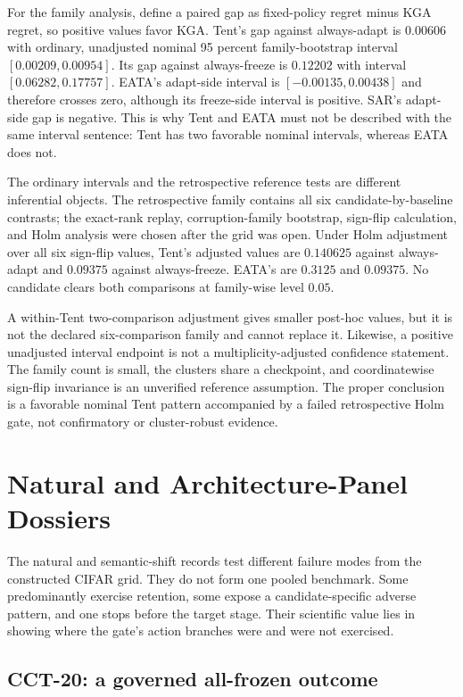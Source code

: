 For the family analysis, define a paired gap as fixed-policy regret minus KGA regret, so positive
values favor KGA.  Tent's gap against always-adapt is $0.00606$ with ordinary, unadjusted nominal
95 percent family-bootstrap interval $[0.00209,0.00954]$.  Its gap against always-freeze is
$0.12202$ with interval $[0.06282,0.17757]$.  EATA's adapt-side interval is
$[-0.00135,0.00438]$ and therefore crosses zero, although its freeze-side interval is positive.
SAR's adapt-side gap is negative.  This is why Tent and EATA must not be described with the same
interval sentence: Tent has two favorable nominal intervals, whereas EATA does not.

The ordinary intervals and the retrospective reference tests are different inferential objects.
The retrospective family contains all six candidate-by-baseline contrasts; the exact-rank replay,
corruption-family bootstrap, sign-flip calculation, and Holm analysis were chosen after the grid
was open.  Under Holm adjustment over all six sign-flip values, Tent's adjusted values are
$0.140625$ against always-adapt and $0.09375$ against always-freeze.  EATA's are $0.3125$ and
$0.09375$.  No candidate clears both comparisons at family-wise level $0.05$.

A within-Tent two-comparison adjustment gives smaller post-hoc values, but it is not the declared
six-comparison family and cannot replace it.  Likewise, a positive unadjusted interval endpoint is
not a multiplicity-adjusted confidence statement.  The family count is small, the clusters share a
checkpoint, and coordinatewise sign-flip invariance is an unverified reference assumption.  The
proper conclusion is a favorable nominal Tent pattern accompanied by a failed retrospective Holm
gate, not confirmatory or cluster-robust evidence.

\section{Natural and Architecture-Panel Dossiers}
\label{fr:sec-natural-dossiers}

The natural and semantic-shift records test different failure modes from the constructed CIFAR
grid.  They do not form one pooled benchmark.  Some predominantly exercise retention, some expose
a candidate-specific adverse pattern, and one stops before the target stage.  Their scientific
value lies in showing where the gate's action branches were and were not exercised.

\subsection{CCT-20: a governed all-frozen outcome}
\label{fr:sec-cct-dossier}

